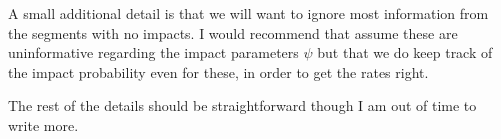 \documentclass[twocolumn,showpacs,aps,prd,nobibnotes,nofootinbib,floatfix]{revtex4-1}
\begin{document}
A small additional detail is that we will want to ignore most information from the segments with no impacts.  I would recommend that assume these are uninformative regarding the impact parameters $\psi$ but that we do keep track of the impact probability even for these, in order to get the rates right.

The rest of the details should be straightforward though I am out of time to write more.
\end{document}

